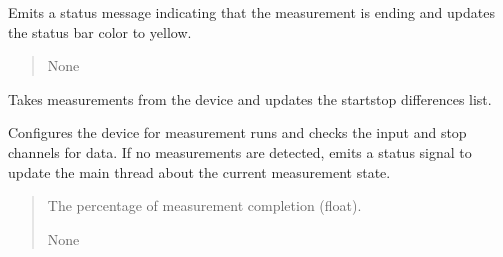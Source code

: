 \documentclass[letterpaper,10pt,english]{sphinxmanual}
\begin{document}
\begin{fulllineitems}
\begin{fulllineitems}
\sphinxAtStartPar
Emits a status message indicating that the measurement is ending and updates the status bar color to yellow.
\begin{quote}\begin{description}
\sphinxAtStartPar
None

\end{description}\end{quote}

\end{fulllineitems}


\begin{fulllineitems}
\label{\detokenize{FLIMGraphics:FLIMGraphics.WorkerThreadFLIM.takeMeasurements}}
\pysigstartsignatures
{}
\pysigstopsignatures
\sphinxAtStartPar
Takes measurements from the device and updates the start\sphinxhyphen{}stop differences list.

\sphinxAtStartPar
Configures the device for measurement runs and checks the input and stop channels for data.
If no measurements are detected, emits a status signal to update the main thread about the current measurement state.
\begin{quote}\begin{description}
\sphinxAtStartPar
{} \textendash{} The percentage of measurement completion (float).

\sphinxAtStartPar
None

\end{description}\end{quote}

\end{fulllineitems}


\begin{fulllineitems}
\label{\detokenize{FLIMGraphics:FLIMGraphics.WorkerThreadFLIM.updateLabel}}
\pysigstartsignatures
{}
\pysigstopsignatures
\end{fulllineitems}


\end{fulllineitems}
\end{document}

